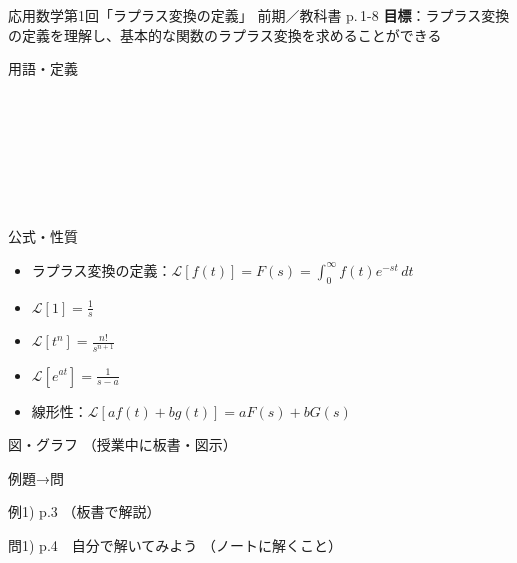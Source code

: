 \documentclass[aspectratio=43,professionalfonts,handout]{beamer}
\newcommand{\LectureNum}{1}
\newcommand{\LectureTitle}{ラプラス変換の定義}
\newcommand{\TextPages}{p.\,1-8}
\newcommand{\CourseName}{応用数学}
\renewcommand{\TermName}{前期}
\begin{document}
\begin{frame}{\CourseName\quad 第\LectureNum 回「\LectureTitle 」}
  {\small \TermName\quad \TeacherName\quad ／\quad 教科書 \TextPages\quad
  \textbf{目標}：ラプラス変換の定義を理解し、基本的な関数のラプラス変換を求めることができる}

  \begin{block}{用語・定義}
  \begin{description}[labelwidth=5.5em]
    \item[\kw{ラプラス変換}] ~
    \item[\kw{原関数 f(t)}] ~
    \item[\kw{像関数 F(s)}] ~
    \item[\kw{線形性}] ~
  \end{description}
  \end{block}
\end{frame}

\begin{frame}{公式・性質}
  \begin{block}{}
  \begin{itemize}
    \item ラプラス変換の定義：$\mathcal{L}[f(t)] = F(s) = \int_0^\infty f(t)e^{-st}\,dt$
    \item $\mathcal{L}[1] = \frac{1}{s}$
    \item $\mathcal{L}[t^n] = \frac{n!}{s^{n+1}}$
    \item $\mathcal{L}[e^{at}] = \frac{1}{s-a}$
    \item 線形性：$\mathcal{L}[af(t)+bg(t)] = aF(s)+bG(s)$
  \end{itemize}
  \end{block}
\end{frame}

\begin{frame}{図・グラフ}
  \centering
  \vfill
  {\large （授業中に板書・図示）}
  \vfill
\end{frame}

\begin{frame}{例題→問}
  \begin{exampleblock}{例1) p.3}
    （板書で解説）
  \end{exampleblock}

  \vfill

  \begin{block}{問1) p.4　自分で解いてみよう}
    （ノートに解くこと）
  \end{block}
\end{frame}
\end{document}
